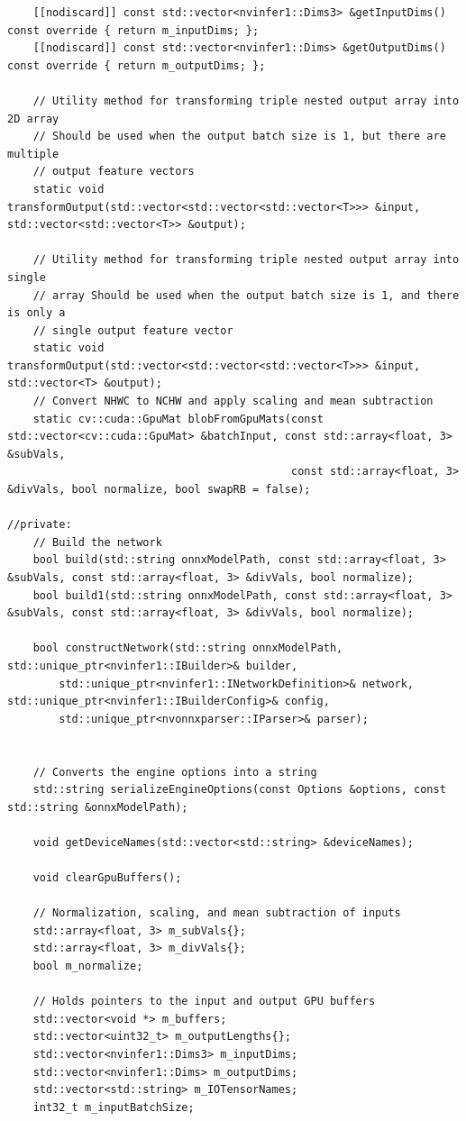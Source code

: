 \begin{lstlisting}
    [[nodiscard]] const std::vector<nvinfer1::Dims3> &getInputDims() const override { return m_inputDims; };
    [[nodiscard]] const std::vector<nvinfer1::Dims> &getOutputDims() const override { return m_outputDims; };

    // Utility method for transforming triple nested output array into 2D array
    // Should be used when the output batch size is 1, but there are multiple
    // output feature vectors
    static void transformOutput(std::vector<std::vector<std::vector<T>>> &input, std::vector<std::vector<T>> &output);

    // Utility method for transforming triple nested output array into single
    // array Should be used when the output batch size is 1, and there is only a
    // single output feature vector
    static void transformOutput(std::vector<std::vector<std::vector<T>>> &input, std::vector<T> &output);
    // Convert NHWC to NCHW and apply scaling and mean subtraction
    static cv::cuda::GpuMat blobFromGpuMats(const std::vector<cv::cuda::GpuMat> &batchInput, const std::array<float, 3> &subVals,
                                            const std::array<float, 3> &divVals, bool normalize, bool swapRB = false);

//private:
    // Build the network
    bool build(std::string onnxModelPath, const std::array<float, 3> &subVals, const std::array<float, 3> &divVals, bool normalize);
    bool build1(std::string onnxModelPath, const std::array<float, 3> &subVals, const std::array<float, 3> &divVals, bool normalize);

    bool constructNetwork(std::string onnxModelPath, std::unique_ptr<nvinfer1::IBuilder>& builder,
        std::unique_ptr<nvinfer1::INetworkDefinition>& network, std::unique_ptr<nvinfer1::IBuilderConfig>& config,
        std::unique_ptr<nvonnxparser::IParser>& parser);


    // Converts the engine options into a string
    std::string serializeEngineOptions(const Options &options, const std::string &onnxModelPath);

    void getDeviceNames(std::vector<std::string> &deviceNames);

    void clearGpuBuffers();

    // Normalization, scaling, and mean subtraction of inputs
    std::array<float, 3> m_subVals{};
    std::array<float, 3> m_divVals{};
    bool m_normalize;

    // Holds pointers to the input and output GPU buffers
    std::vector<void *> m_buffers;
    std::vector<uint32_t> m_outputLengths{};
    std::vector<nvinfer1::Dims3> m_inputDims;
    std::vector<nvinfer1::Dims> m_outputDims;
    std::vector<std::string> m_IOTensorNames;
    int32_t m_inputBatchSize;


\end{lstlisting}
